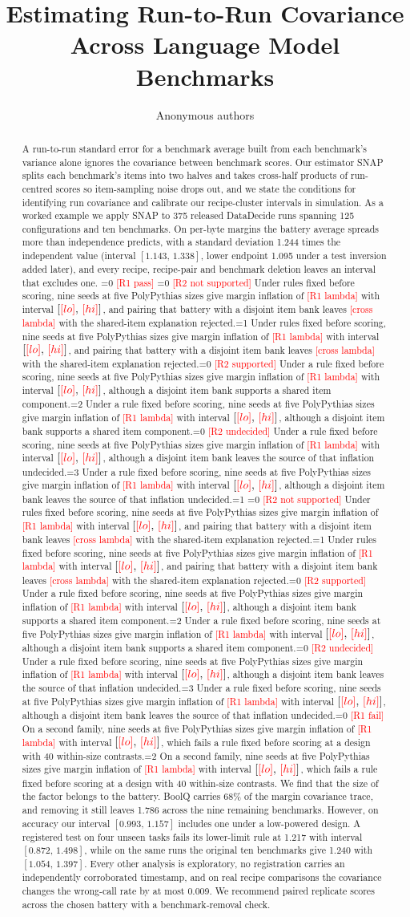 \documentclass{article}
\title{Estimating Run-to-Run Covariance\\Across Language Model Benchmarks}
\author{Anonymous authors}
\newcommand{\ci}[2]{\ensuremath{[#1,\,#2]}}
\newcommand{\pending}[1]{\textcolor{red}{[#1]}}
\newcommand{\Ronecase}{0}
\newcommand{\Rtwocase}{0}
\newcommand{\outcome}[4]{\ifnum#1=0 \pending{#3} #4\else\ifnum#1=#2 #4\fi\fi}
\begin{document}
\maketitle
\begin{abstract}
A run-to-run standard error for a benchmark average built from each benchmark's variance alone ignores the covariance between benchmark scores. Our estimator SNAP splits each benchmark's items into two halves and takes cross-half products of run-centred scores so item-sampling noise drops out, and we state the conditions for identifying run covariance and calibrate our recipe-cluster intervals in simulation. As a worked example we apply SNAP to 375 released DataDecide runs spanning 125 configurations and ten benchmarks. On per-byte margins the battery average spreads more than independence predicts, with a standard deviation 1.244 times the independent value (interval \ci{1.143}{1.338}, lower endpoint 1.095 under a test inversion added later), and every recipe, recipe-pair and benchmark deletion leaves an interval that excludes one. \outcome{\Ronecase}{1}{R1 pass}{\outcome{\Rtwocase}{1}{R2 not supported}{Under rules fixed before scoring, nine seeds at five PolyPythias sizes give margin inflation of \pending{R1 lambda} with interval \ci{\pending{lo}}{\pending{hi}}, and pairing that battery with a disjoint item bank leaves \pending{cross lambda} with the shared-item explanation rejected.}\outcome{\Rtwocase}{2}{R2 supported}{Under a rule fixed before scoring, nine seeds at five PolyPythias sizes give margin inflation of \pending{R1 lambda} with interval \ci{\pending{lo}}{\pending{hi}}, although a disjoint item bank supports a shared item component.}\outcome{\Rtwocase}{3}{R2 undecided}{Under a rule fixed before scoring, nine seeds at five PolyPythias sizes give margin inflation of \pending{R1 lambda} with interval \ci{\pending{lo}}{\pending{hi}}, although a disjoint item bank leaves the source of that inflation undecided.}}\outcome{\Ronecase}{2}{R1 fail}{On a second family, nine seeds at five PolyPythias sizes give margin inflation of \pending{R1 lambda} with interval \ci{\pending{lo}}{\pending{hi}}, which fails a rule fixed before scoring at a design with 40 within-size contrasts.} We find that the size of the factor belongs to the battery. BoolQ carries 68\% of the margin covariance trace, and removing it still leaves 1.786 across the nine remaining benchmarks. However, on accuracy our interval \ci{0.993}{1.157} includes one under a low-powered design. A registered test on four unseen tasks fails its lower-limit rule at 1.217 with interval \ci{0.872}{1.498}, while on the same runs the original ten benchmarks give 1.240 with \ci{1.054}{1.397}. Every other analysis is exploratory, no registration carries an independently corroborated timestamp, and on real recipe comparisons the covariance changes the wrong-call rate by at most 0.009. We recommend paired replicate scores across the chosen battery with a benchmark-removal check.
\end{abstract}
\end{document}
